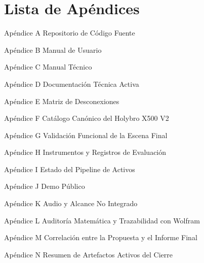 \documentclass[12pt,letterpaper]{article}
\begin{document}
\section{Lista de Apéndices}
\noindent Apéndice A \quad Repositorio de Código Fuente \cftdotfill{\cftdotsep} \pageref{apendice:A}\par\vspace{0.15\baselineskip}
\noindent Apéndice B \quad Manual de Usuario \cftdotfill{\cftdotsep} \pageref{apendice:B}\par\vspace{0.15\baselineskip}
\noindent Apéndice C \quad Manual Técnico \cftdotfill{\cftdotsep} \pageref{apendice:C}\par\vspace{0.15\baselineskip}
\noindent Apéndice D \quad Documentación Técnica Activa \cftdotfill{\cftdotsep} \pageref{apendice:D}\par\vspace{0.15\baselineskip}
\noindent Apéndice E \quad Matriz de Desconexiones \cftdotfill{\cftdotsep} \pageref{apendice:E}\par\vspace{0.15\baselineskip}
\noindent Apéndice F \quad Catálogo Canónico del Holybro X500 V2 \cftdotfill{\cftdotsep} \pageref{apendice:F}\par\vspace{0.15\baselineskip}
\noindent Apéndice G \quad Validación Funcional de la Escena Final \cftdotfill{\cftdotsep} \pageref{apendice:G}\par\vspace{0.15\baselineskip}
\noindent Apéndice H \quad Instrumentos y Registros de Evaluación \cftdotfill{\cftdotsep} \pageref{apendice:H}\par\vspace{0.15\baselineskip}
\noindent Apéndice I \quad Estado del Pipeline de Activos \cftdotfill{\cftdotsep} \pageref{apendice:I}\par\vspace{0.15\baselineskip}
\noindent Apéndice J \quad Demo Público \cftdotfill{\cftdotsep} \pageref{apendice:J}\par\vspace{0.15\baselineskip}
\noindent Apéndice K \quad Audio y Alcance No Integrado \cftdotfill{\cftdotsep} \pageref{apendice:K}\par\vspace{0.15\baselineskip}
\noindent Apéndice L \quad Auditoría Matemática y Trazabilidad con Wolfram \cftdotfill{\cftdotsep} \pageref{apendice:L}\par\vspace{0.15\baselineskip}
\noindent Apéndice M \quad Correlación entre la Propuesta y el Informe Final \cftdotfill{\cftdotsep} \pageref{apendice:M}\par\vspace{0.15\baselineskip}
\noindent Apéndice N \quad Resumen de Artefactos Activos del Cierre \cftdotfill{\cftdotsep} \pageref{apendice:N}\par\vspace{0.15\baselineskip}
\end{document}
